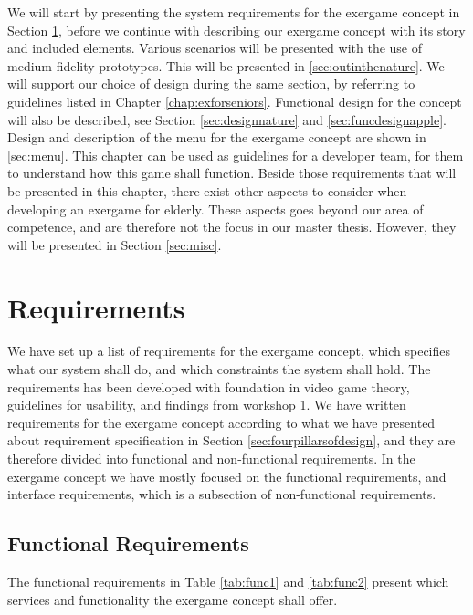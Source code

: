 We will start by presenting the system requirements for the exergame concept in Section \ref{sec:req}, before we continue with describing our exergame concept with its story and included elements. Various scenarios will be presented with the use of medium-fidelity prototypes. This will be presented in \ref{sec:outinthenature}. We will support our choice of design during the same section, by referring to guidelines listed in Chapter \ref{chap:exforseniors}. Functional design for the concept will also be described, see Section \ref{sec:designnature} and \ref{sec:funcdesignapple}. Design and description of the menu for the exergame concept are shown in \ref{sec:menu}. This chapter can be used as guidelines for a developer team, for them to understand how this game shall function. Beside those requirements that will be presented in this chapter, there exist other aspects to consider when developing an exergame for elderly. These aspects goes beyond our area of competence, and are therefore not the focus in our master thesis. However, they will be presented in Section \ref{sec:misc}.

\section{Requirements}
\label{sec:req}
We have set up a list of requirements for the exergame concept, which specifies what our system shall do, and which constraints the system shall hold. The requirements has been developed with foundation in video game theory, guidelines for usability, and findings from workshop 1. We have written requirements for the exergame concept according to what we have presented about requirement specification in Section \ref{sec:fourpillarsofdesign}, and they are therefore divided into functional and non-functional requirements. In the exergame concept we have mostly focused on the functional requirements, and interface requirements, which is a subsection of non-functional requirements. 

\subsection{Functional Requirements}
The functional requirements in Table \ref{tab:func1} and \ref{tab:func2} present which services and functionality the exergame concept shall offer.


